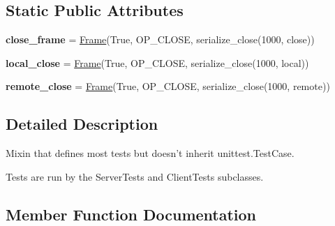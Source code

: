 \subsection*{Static Public Attributes}
\begin{DoxyCompactItemize}
\item 
\mbox{\label{classwebsockets_1_1test__protocol_1_1_common_tests_a8e95f8b64add62abe8168c6b1acce7e1}} 
{\bfseries close\+\_\+frame} = \hyperlink{classwebsockets_1_1framing_1_1_frame}{Frame}(True, O\+P\+\_\+\+C\+L\+O\+SE, serialize\+\_\+close(1000, \textquotesingle{}close\textquotesingle{}))
\item 
\mbox{\label{classwebsockets_1_1test__protocol_1_1_common_tests_ab051ce2f119028749767cb82131593ee}} 
{\bfseries local\+\_\+close} = \hyperlink{classwebsockets_1_1framing_1_1_frame}{Frame}(True, O\+P\+\_\+\+C\+L\+O\+SE, serialize\+\_\+close(1000, \textquotesingle{}local\textquotesingle{}))
\item 
\mbox{\label{classwebsockets_1_1test__protocol_1_1_common_tests_affa14d56361e7f5c44c739e526616924}} 
{\bfseries remote\+\_\+close} = \hyperlink{classwebsockets_1_1framing_1_1_frame}{Frame}(True, O\+P\+\_\+\+C\+L\+O\+SE, serialize\+\_\+close(1000, \textquotesingle{}remote\textquotesingle{}))
\end{DoxyCompactItemize}


\subsection{Detailed Description}
\begin{DoxyVerb}Mixin that defines most tests but doesn't inherit unittest.TestCase.

Tests are run by the ServerTests and ClientTests subclasses.\end{DoxyVerb}
 

\subsection{Member Function Documentation}
\mbox{\label{classwebsockets_1_1test__protocol_1_1_common_tests_a8d230d6cd9c4f2c3ddb81970ee2f73c9}} 
